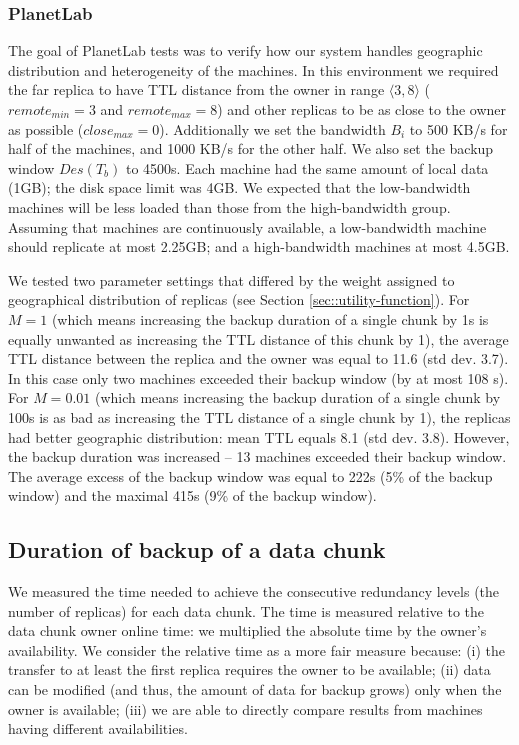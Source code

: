 \documentclass[10pt, final, conference, letterpaper]{IEEEtran}
\begin{document}
\subsubsection{PlanetLab}
The goal of PlanetLab tests was to verify how our system handles geographic distribution and heterogeneity of the machines.
In this environment we required the far replica to have TTL distance from the owner in range $\langle 3, 8 \rangle$ ($remote_{min} = 3$ and $remote_{max} = 8$) and other replicas to be as close to the owner as possible ($close_{max} = 0$). 
Additionally we set the bandwidth $B_i$ to 500 KB/s for half of the machines, and 1000 KB/s for the other half. We also set the backup window $Des(T_b)$ to 4500s. 
Each machine had the same amount of local data (1GB); the disk space limit was 4GB.
We expected that the low-bandwidth machines will be less loaded than those from the high-bandwidth group. Assuming that machines are continuously available, a low-bandwidth machine should replicate at most 2.25GB; and a high-bandwidth machines at most 4.5GB.

We tested two parameter settings that differed by the weight assigned to geographical distribution of replicas (see Section \ref{sec::utility-function}). For $M = 1$ (which means increasing the backup duration of a single chunk by 1s is equally unwanted as increasing the TTL distance of this chunk by 1), the average TTL distance between the replica and the owner was equal to 11.6 (std dev. 3.7). In this case only two machines exceeded their backup window (by at most 108 s). For $M = 0.01$ (which means increasing the backup duration of a single chunk by 100s is as bad as increasing the TTL distance of a single chunk by 1), the replicas had better geographic distribution: mean TTL equals 8.1 (std dev. 3.8). However, the backup duration was increased -- 13 machines exceeded their backup window. The average excess of the backup window was equal to 222s (5\% of the backup window) and the maximal 415s (9\% of the backup window).

\subsection{Duration of backup of a data chunk}
We measured the time needed to achieve the consecutive redundancy levels (the number of replicas) for each data chunk. The time is measured relative to the data chunk owner online time: we multiplied the absolute time by the owner's availability. We consider the relative time as a more fair measure because: (i) the transfer to at least the first replica requires the owner to be available; (ii) data can be modified (and thus, the amount of data for backup grows) only when the owner is available; (iii) we are able to directly compare results from machines having different availabilities.
\end{document}
